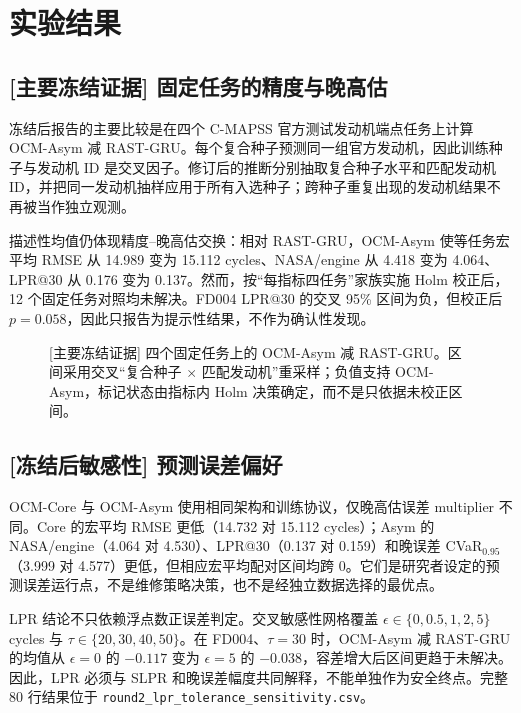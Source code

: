 
\FloatBarrier
\section{实验结果}

\subsection{[主要冻结证据] 固定任务的精度与晚高估}

冻结后报告的主要比较是在四个 C-MAPSS 官方测试发动机端点任务上计算 OCM-Asym 减 RAST-GRU。每个复合种子预测同一组官方发动机，因此训练种子与发动机 ID 是交叉因子。修订后的推断分别抽取复合种子水平和匹配发动机 ID，并把同一发动机抽样应用于所有入选种子；跨种子重复出现的发动机结果不再被当作独立观测。



描述性均值仍体现精度--晚高估交换：相对 RAST-GRU，OCM-Asym 使等任务宏平均 RMSE 从 14.989 变为 15.112 cycles、NASA/engine 从 4.418 变为 4.064、LPR@30 从 0.176 变为 0.137。然而，按“每指标四任务”家族实施 Holm 校正后，12 个固定任务对照均未解决。FD004 LPR@30 的交叉 95\% 区间为负，但校正后 $p=0.058$，因此只报告为提示性结果，不作为确认性发现。

\begin{figure}[!t]
\centering
{}
\caption{[主要冻结证据] 四个固定任务上的 OCM-Asym 减 RAST-GRU。区间采用交叉“复合种子 $\times$ 匹配发动机”重采样；负值支持 OCM-Asym，标记状态由指标内 Holm 决策确定，而不是只依据未校正区间。}
\label{fig:round2-primary-crossed-zh}
\end{figure}
\FloatBarrier

\subsection{[冻结后敏感性] 预测误差偏好}

OCM-Core 与 OCM-Asym 使用相同架构和训练协议，仅晚高估误差 multiplier 不同。Core 的宏平均 RMSE 更低（14.732 对 15.112 cycles）；Asym 的 NASA/engine（4.064 对 4.530）、LPR@30（0.137 对 0.159）和晚误差 CVaR$_{0.95}$（3.999 对 4.577）更低，但相应宏平均配对区间均跨 0。它们是研究者设定的预测误差运行点，不是维修策略决策，也不是经独立数据选择的最优点。



LPR 结论不只依赖浮点数正误差判定。交叉敏感性网格覆盖 $\epsilon\in\{0,0.5,1,2,5\}$ cycles 与 $\tau\in\{20,30,40,50\}$。在 FD004、$\tau=30$ 时，OCM-Asym 减 RAST-GRU 的均值从 $\epsilon=0$ 的 $-0.117$ 变为 $\epsilon=5$ 的 $-0.038$，容差增大后区间更趋于未解决。因此，LPR 必须与 SLPR 和晚误差幅度共同解释，不能单独作为安全终点。完整 80 行结果位于 \texttt{round2\_lpr\_tolerance\_sensitivity.csv}。

